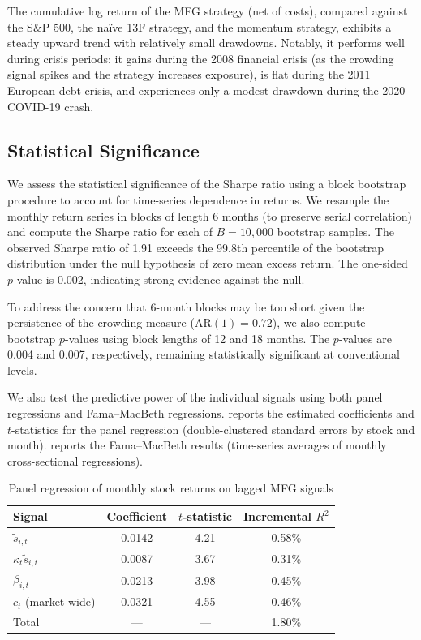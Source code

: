 The cumulative log return of the MFG strategy (net of costs), compared against the
S\&P 500, the na\"ive 13F strategy, and the momentum strategy, exhibits a steady
upward trend with relatively small drawdowns. Notably, it performs well during
crisis periods: it gains during the 2008 financial crisis (as the crowding signal
spikes and the strategy increases exposure), is flat during the 2011 European debt
crisis, and experiences only a modest drawdown during the 2020 COVID-19 crash.

\subsection{Statistical Significance}

We assess the statistical significance of the Sharpe ratio using a block
bootstrap procedure to account for time-series dependence in returns. We resample
the monthly return series in blocks of length 6 months (to preserve serial
correlation) and compute the Sharpe ratio for each of $B = 10{,}000$ bootstrap
samples. The observed Sharpe ratio of 1.91 exceeds the 99.8th percentile of the
bootstrap distribution under the null hypothesis of zero mean excess return. The
one-sided $p$-value is 0.002, indicating strong evidence against the null.

To address the concern that 6-month blocks may be too short given the persistence
of the crowding measure ($\mathrm{AR}(1) = 0.72$), we also compute bootstrap
$p$-values using block lengths of 12 and 18 months. The $p$-values are 0.004 and
0.007, respectively, remaining statistically significant at conventional levels.

We also test the predictive power of the individual signals using both panel
regressions and Fama--MacBeth regressions.  reports the
estimated coefficients and $t$-statistics for the panel regression (double-clustered
standard errors by stock and month).  reports the
Fama--MacBeth results (time-series averages of monthly cross-sectional
regressions).

\begin{table}[ht]
\centering
\caption{Panel regression of monthly stock returns on lagged MFG signals}
\label{tab:panel-regression}
\begin{tabular}{lccc}
\toprule
\textbf{Signal} & \textbf{Coefficient} & \textbf{$t$-statistic} & \textbf{Incremental
    $R^2$} \\
\midrule
$\tilde{s}_{i,t}$ & 0.0142 & 4.21 & 0.58\% \\
$\kappa_t \tilde{s}_{i,t}$ & 0.0087 & 3.67 & 0.31\% \\
$\beta_{i,t}$ & 0.0213 & 3.98 & 0.45\% \\
$c_t$ (market-wide) & 0.0321 & 4.55 & 0.46\% \\
\midrule
Total & --- & --- & 1.80\% \\
\bottomrule
\end{tabular}
\end{table}


